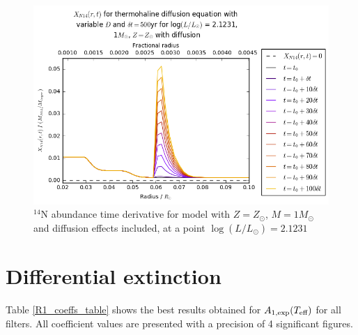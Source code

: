 \documentclass[12pt, a4paper]{report}
\begin{document}
\begin{figure}
\begin{center}
\includegraphics[scale=0.4]{../mu_test_data/mu_test_graphs/eq_logL=2p1231_time_diff_eq_Dvar_10dt_dmu_k_lim.png}
\caption{$^{14}$N abundance time derivative for model with $Z = Z_{\odot}$, $M = 1M_{\odot}$ and diffusion effects included, at a point $\log(L/L_{\odot}) = 2.1231$}
\label{dXN14/dt_colour}
\end{center}
\end{figure}

\section{Differential extinction}


Table \ref{R1_coeffs_table} shows the best results obtained for $A_{1,\textnormal{exp}} (T_{\textnormal{eff}})$ for all filters. All coefficient values are presented with a precision of 4 significant figures. 
\end{document}
